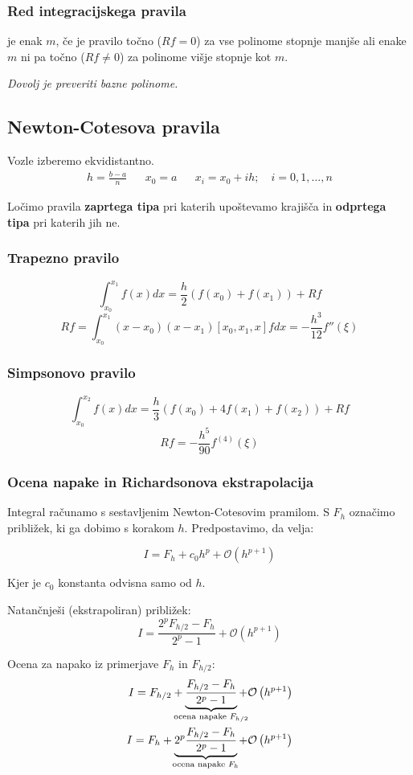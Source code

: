 \begin{multicols}{5}
\subsubsection*{Red integracijskega pravila}
je enak $m$, če je pravilo točno ($Rf = 0$) za vse polinome stopnje manjše ali enake $m$ ni pa točno ($Rf \neq 0$) za polinome višje stopnje kot $m$.

\textit{Dovolj je preveriti bazne polinome.}

\subsection*{Newton-Cotesova pravila}
Vozle izberemo ekvidistantno.
\begin{align*}
    h = \frac{b-a}{n} && x_0 = a && x_i = x_0 + ih; \quad i = 0, 1, \dots, n
\end{align*}

Ločimo pravila \textbf{zaprtega tipa} pri katerih upoštevamo krajišča in \textbf{odprtega tipa} pri katerih jih ne.

\subsubsection*{Trapezno pravilo}
\[ \int_{x_0}^{x_1} f(x) dx = \frac{h}{2} (f(x_0) + f(x_1)) + Rf\]
\[ Rf = \int_{x_0}^{x_1} (x-x_0)(x-x_1) [x_0, x_1, x] f dx = -\frac{h^3}{12} f''(\xi)\]

\subsubsection*{Simpsonovo pravilo}
\[ \int_{x_0}^{x_2} f(x) dx = \frac{h}{3} (f(x_0) + 4f(x_1) + f(x_2)) + Rf\]
\[ Rf = -\frac{h^5}{90} f^{(4)}(\xi)\]

\subsubsection*{Ocena napake in Richardsonova ekstrapolacija}
Integral računamo s sestavljenim Newton-Cotesovim pramilom. S $F_h$ označimo približek, ki ga dobimo s 
korakom $h$. Predpostavimo, da velja:

\[ I = F_h + c_0 h^p + \mathcal{O}\left( h^{p+1} \right)\]

Kjer je $c_0$ konstanta odvisna samo od $h$.

Natančnješi (ekstrapoliran) približek:
\[ I = \frac{2^p F_{h/2} - F_h}{2^p - 1} + \mathcal{O}\left(h^{p+1}\right)\]

Ocena za napako iz primerjave $F_h$ in $F_{h/2}$:
\begin{align*}
    I = F_{h/2} + \underbrace{\frac{F_{h/2} - F_h}{2^p - 1}}_{\mathclap{\text{ocena napake $F_{h/2}$}}} + \mathcal{O}\left( h^{p+1} \right) \\
    I = F_{h} + \underbrace{2^p\frac{F_{h/2} - F_h}{2^p - 1}}_{\mathclap{\text{ocena napake $F_{h}$}}} + \mathcal{O}\left( h^{p+1} \right) \\
\end{align*}

\end{multicols}
